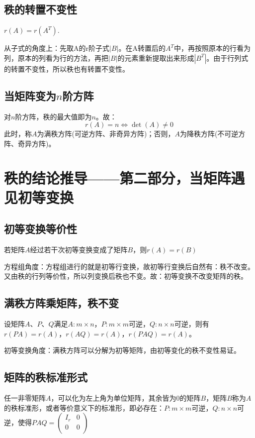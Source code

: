 \subsection{秩的转置不变性}
\begin{property}
	$r(A)=r(A^T)$.
\end{property}
\begin{remark}
	从子式的角度上：先取A的r阶子式$|B|$。在A转置后的$A^T$中，再按照原本的行看为列，原本的列看为行的方法，再把$|B|$的元素重新提取出来形成$|B^T|$。由于行列式的转置不变性，所以秩也有转置不变性。
\end{remark}
\subsection{当矩阵变为$n$阶方阵}
对$n$阶方阵，秩的最大值即为$n$。故：
$$r(A)=n\Leftrightarrow\det(A)\neq 0$$
此时，称$A$为满秩方阵(可逆方阵、非奇异方阵)；否则，$A$为降秩方阵(不可逆方阵、奇异方阵)。
\section{秩的结论推导——第二部分，当矩阵遇见初等变换}
\subsection{初等变换等价性}
\begin{property}
	若矩阵$A$经过若干次初等变换变成了矩阵$B$，则$r(A)=r(B)$
\end{property}
\begin{remark}
	方程组角度：方程组进行的就是初等行变换，故初等行变换后自然有：秩不改变。又由秩的行列等价性，所以列变换后秩也不变。故：初等变换不改变矩阵的秩。
\end{remark}
\subsection{满秩方阵乘矩阵，秩不变}
\begin{property}
	设矩阵$A$、$P$、$Q$满足$A:m\times n$，$P:m\times m$可逆，$Q:n\times n$可逆，则有$r(PA)=r(A)$，$r(AQ)=r(A)$，$r(PAQ)=r(A)$。
\end{property}
\begin{remark}
	初等变换角度：满秩方阵可以分解为初等矩阵，由初等变化的秩不变性易证。
\end{remark}
\subsection{矩阵的秩标准形式}
任一非零矩阵$A$，可以化为左上角为单位矩阵，其余皆为0的矩阵$B$，矩阵$B$称为$A$的秩标准形，或者等价意义下的标准形，即必存在：$P:m\times m$可逆，$Q:n\times n$可逆，使得$PAQ= \left (
	\begin{matrix}
			I_r & 0 \\
			0   & 0 \\
		\end{matrix}
	\right  )$

